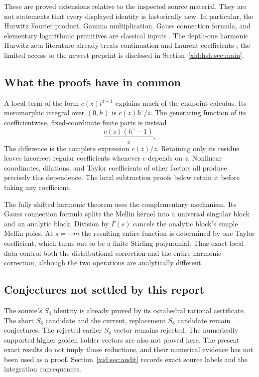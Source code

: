These are proved extensions relative to the inspected source material.
They are not statements that every displayed identity is historically
new. In particular, the Hurwitz Fourier product, Gamma multiplication,
Gauss connection formula, and elementary logarithmic primitives are
classical inputs \cite{EspinosaMoll1,EspinosaMoll2,DLMFhurwitz,
hsh:DLMFGauss,wat:DavidH}. The depth-one harmonic Hurwitz-zeta literature
already treats continuation and Laurent coefficients
\cite{hsh:Kargin2023,hsh:KaraCan2026}; the limited access to the newest
preprint is disclosed in Section~\ref{xid:hsh:sec:main}.

\subsection{What the proofs have in common}

A local term of the form $c(z)t^{z-1}$ explains much of the endpoint
calculus. Its meromorphic integral over $(0,h)$ is $c(z)h^z/z$.
The generating function of its coefficientwise, fixed-coordinate finite
parts is instead
\[
 \frac{c(z)(h^z-1)}z.
\]
The difference is the complete expression $c(z)/z$. Retaining only its
residue leaves incorrect regular coefficients whenever $c$ depends on
$z$. Nonlinear coordinates, dilations, and Taylor coefficients of other
factors all produce precisely this dependence. The local subtraction
proofs below retain it before taking any coefficient.

The fully shifted harmonic theorem uses the complementary mechanism.
Its Gauss connection formula splits the Mellin kernel into a universal
singular block and an analytic block. Division by $\Gamma(s)$ cancels
the analytic block's simple Mellin poles. At $s=-m$ the resulting entire
function is determined by one Taylor coefficient, which turns out to be
a finite Stirling polynomial. Thus exact local data control both the
distributional correction and the entire harmonic correction, although
the two operations are analytically different.

\subsection{Conjectures not settled by this report}

The source's $S_4$ identity is already proved by its octahedral rational
certificate. The short $S_6$ candidate and the current, replacement $S_8$
candidate remain conjectures. The rejected earlier $S_8$ vector remains
rejected. The numerically supported higher golden ladder vectors are
also not proved here. The present exact results do not imply those
reductions, and their numerical evidence has not been used as a proof.
Section~\ref{xid:sec:audit} records exact source labels and the integration
consequences.
